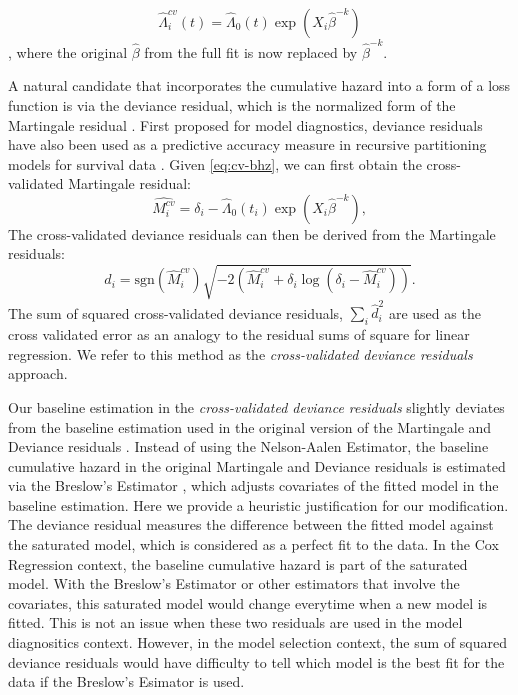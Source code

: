 \begin{equation}
 \label{eq:cv-bhz}
  \hat{\Lambda}^{cv}_{i}(t) =  \hat{\Lambda}_{0}(t)\exp(X_i\hat\beta^{-k})
\end{equation}
, where the original $\hat{\beta}$ from the full fit is now replaced by $\hat{\beta}^{-k}$.

A natural candidate that incorporates the cumulative hazard into a form of a loss function is via the deviance residual, which is the normalized form of the Martingale residual \citep{Therneau1990}. First proposed for model diagnostics, deviance residuals have also been used as a predictive accuracy measure in recursive partitioning models for survival data \citep{Therneau2018}.  Given \eqref{eq:cv-bhz}, we can first obtain the cross-validated Martingale residual: 
	\begin{equation}
	\hat{M^{cv}_{i}} = \delta_{i} - \hat{\Lambda}_{0}(t_{i})\exp(X_i\hat\beta^{-k}),
	\end{equation} 
The cross-validated deviance residuals can then be derived from the Martingale residuals: 
	\begin{equation} 
	d_{i} = \text{sgn}(\hat{M}^{cv}_{i})\sqrt{-2(\hat{M}^{cv}_{i} + \delta_{i}\log(\delta_{i} - \hat{M}^{cv}_{i}))}.
	\end{equation}
The sum of squared cross-validated deviance residuals, $\sum_{i}\hat{d}_{i}^2$ are used as the cross validated error as an analogy to the residual sums of square for linear regression. We refer to this method as the \emph{cross-validated deviance residuals} approach.

Our baseline estimation in the \emph{cross-validated deviance residuals} slightly deviates from the baseline estimation used in the original version of the Martingale and Deviance residuals \citep{Therneau1990}. Instead of using the Nelson-Aalen Estimator, the baseline cumulative hazard in the original Martingale and Deviance residuals is estimated via the Breslow's Estimator \citep{breslow1972}, which adjusts covariates of the fitted model in the baseline estimation. Here we provide a heuristic justification for our modification. The deviance residual measures the difference between the fitted model against the saturated model, which is considered as a perfect fit to the data. In the Cox Regression context, the baseline cumulative hazard is part of the saturated model. With the Breslow's Estimator or other estimators that involve the covariates, this saturated model would change everytime when a new model is fitted. This is not an issue when these two residuals are used in the model diagnositics context. However, in the model selection context, the sum of squared deviance residuals would have difficulty to tell which model is the best fit for the data if the Breslow's Esimator is used. 

